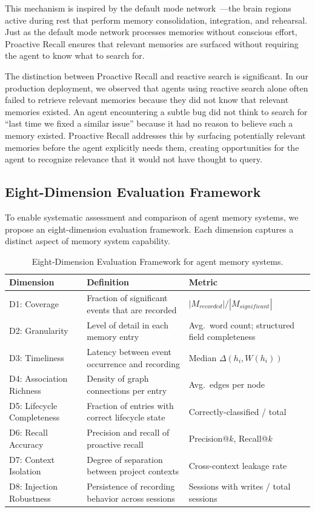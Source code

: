 \documentclass[11pt]{article}
\begin{document}
This mechanism is inspired by the default mode network~\cite{raichle2001}---the brain regions active during rest that perform memory consolidation, integration, and rehearsal. Just as the default mode network processes memories without conscious effort, Proactive Recall ensures that relevant memories are surfaced without requiring the agent to know what to search for.

The distinction between Proactive Recall and reactive search is significant. In our production deployment, we observed that agents using reactive search alone often failed to retrieve relevant memories because they did not know that relevant memories existed. An agent encountering a subtle bug did not think to search for ``last time we fixed a similar issue'' because it had no reason to believe such a memory existed. Proactive Recall addresses this by surfacing potentially relevant memories before the agent explicitly needs them, creating opportunities for the agent to recognize relevance that it would not have thought to query.


\subsection{Eight-Dimension Evaluation Framework}

To enable systematic assessment and comparison of agent memory systems, we propose an eight-dimension evaluation framework. Each dimension captures a distinct aspect of memory system capability.

\begin{table}[H]
\centering
\caption{Eight-Dimension Evaluation Framework for agent memory systems.}
\label{tab:eval}
\small
\begin{tabular}{p{2.8cm}p{5cm}p{4cm}}
\toprule
\textbf{Dimension} & \textbf{Definition} & \textbf{Metric} \\
\midrule
D1: Coverage & Fraction of significant events that are recorded & $|M_{recorded}| / |M_{significant}|$ \\
D2: Granularity & Level of detail in each memory entry & Avg.\ word count; structured field completeness \\
D3: Timeliness & Latency between event occurrence and recording & Median $\Delta(h_i, W(h_i))$ \\
D4: Association Richness & Density of graph connections per entry & Avg.\ edges per node \\
D5: Lifecycle Completeness & Fraction of entries with correct lifecycle state & Correctly-classified / total \\
D6: Recall Accuracy & Precision and recall of proactive recall & Precision@$k$, Recall@$k$ \\
D7: Context Isolation & Degree of separation between project contexts & Cross-context leakage rate \\
D8: Injection Robustness & Persistence of recording behavior across sessions & Sessions with writes / total sessions \\
\bottomrule
\end{tabular}
\end{table}
\end{document}
